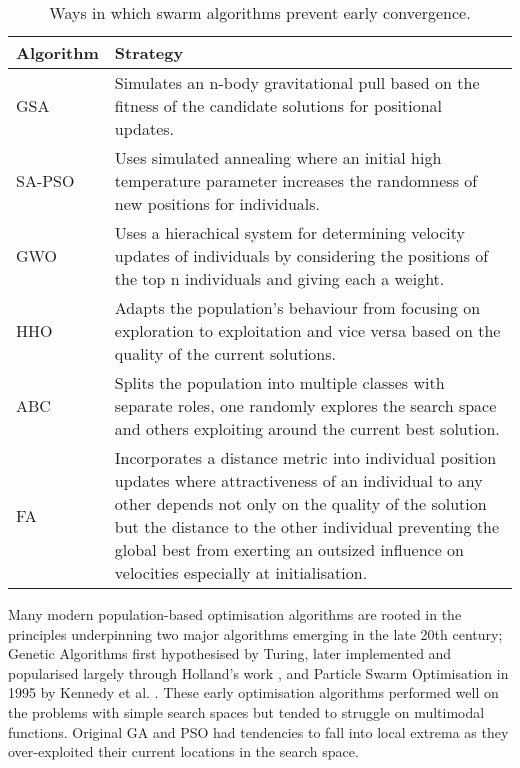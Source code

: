 \documentclass[a4paper, 12pt]{extarticle}
\begin{document}
\begin{table}[h!]
    \centering
    \begin{tabular}{l p{14cm}} 
        \toprule
        \textbf{Algorithm} & \textbf{Strategy}\\
        \midrule
        GSA         & Simulates an n-body gravitational pull based on the fitness of the candidate solutions for positional updates.\\
        SA-PSO      & Uses simulated annealing where an initial high temperature parameter increases the randomness of new positions for individuals.\\
        GWO         & Uses a hierachical system for determining velocity updates of individuals by considering the positions of the top n individuals and giving each a weight. \\
        HHO         & Adapts the population's behaviour from focusing on exploration to exploitation and vice versa based on the quality of the current solutions. \\
        ABC         & Splits the population into multiple classes with separate roles, one randomly explores the search space and others exploiting around the current best solution. \\
        FA          & Incorporates a distance metric into individual position updates where attractiveness of an individual to any other depends not only on the quality of the solution but the distance to the other individual preventing the global best from exerting an outsized influence on velocities especially at initialisation. \\
        \bottomrule
    \end{tabular}
    \caption{Ways in which swarm algorithms prevent early convergence.}
    \label{tab:early}
\end{table}

Many modern population-based optimisation algorithms are rooted in the principles underpinning two major algorithms emerging in the late 20th century; Genetic Algorithms first hypothesised by Turing, later implemented and popularised largely through Holland's work \cite{holland1992genetic}, and Particle Swarm Optimisation in 1995 by Kennedy et al. \cite{kennedy1995particle}. These early optimisation algorithms performed well on the problems with simple search spaces but tended to struggle on multimodal functions. Original GA and PSO had tendencies to fall into local extrema as they over-exploited their current locations in the search space.
\end{document}
